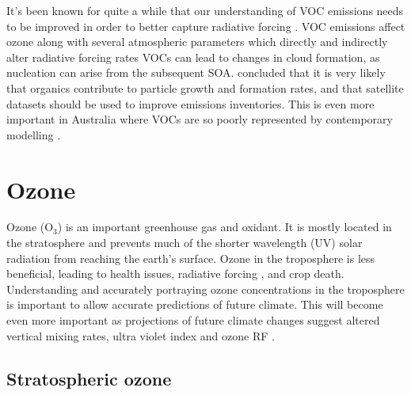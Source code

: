    It's been known for quite a while that our understanding of VOC emissions needs to be improved in order to better capture radiative forcing \parencite{Kanakidou2005}.
    VOC emissions affect ozone along with several atmospheric parameters which directly and indirectly alter radiative forcing rates \parencite[eg.][]{Arneth2008}
    VOCs can lead to changes in cloud formation, as nucleation can arise from the subsequent SOA.
    \textcite{Kanakidou2005} concluded that it is very likely that organics contribute to particle growth and formation rates, and that satellite datasets should be used to improve emissions inventories.
    This is even more important in Australia where VOCs are so poorly represented by contemporary modelling \parencite{Emmerson2016}.

\section{Ozone}
\label{LR:O3}
  
  Ozone (O$_3$) is an important greenhouse gas and oxidant.
  It is mostly located in the stratosphere and prevents much of the shorter wavelength (UV) solar radiation from reaching the earth's surface.
  Ozone in the troposphere is less beneficial, leading to health issues, radiative forcing \parencite{Stevenson2013}, and crop death.
  Understanding and accurately portraying ozone concentrations in the troposphere is important to allow accurate predictions of future climate.
  This will become even more important as projections of future climate changes suggest altered vertical mixing rates, ultra violet index and ozone RF \parencite{Hegglin2009}.
  
  \subsection{Stratospheric ozone}
  
